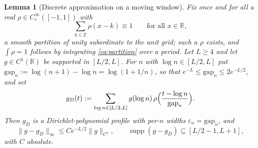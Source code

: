 \documentclass[11pt]{amsart}
\newtheorem{lemma}[theorem]{Lemma}
\theoremstyle{definition}
\theoremstyle{remark}
\newcommand{\R}{\mathbb R}
\newcommand{\Z}{\mathbb Z}
\newcommand{\supp}{\operatorname{supp}}
\begin{document}
\begin{lemma}[Discrete approximation on a moving window]
\label{lem:discreteapprox}
Fix once and for all a real $\rho\in C_c^\infty([-1,1])$ with
\begin{equation}\label{eq:partition}
  \sum_{k\in\Z}\rho(x-k)\equiv1\qquad\text{for all }x\in\R,
\end{equation}
a smooth partition of unity subordinate to the unit grid; such a $\rho$ exists,
and $\int\rho=1$ follows by integrating \eqref{eq:partition} over a period. Let
$L\ge4$ and let $g\in C^1(\R)$ be supported in $[L/2,L]$. For $n$ with
$\log n\in[L/2,L]$ put $\mathrm{gap}_n:=\log(n+1)-\log n=\log(1+1/n)$, so that
$e^{-L}\le\mathrm{gap}_n\le2e^{-L/2}$, and set
\begin{equation}\label{eq:gD}
  g_D(t):=\sum_{\log n\in[L/2,L]}g(\log n)\,
    \rho\Bigl(\frac{t-\log n}{\mathrm{gap}_n}\Bigr).
\end{equation}
Then $g_D$ is a Dirichlet-polynomial profile with per-$n$ widths
$\varepsilon_n=\mathrm{gap}_n$, and
\begin{equation}\label{eq:gDapprox}
  \|g-g_D\|_\infty\le Ce^{-L/2}\|g\|_{C^1},\qquad
  \supp(g-g_D)\subseteq[L/2-1,L+1],
\end{equation}
with $C$ absolute.
\end{lemma}
\end{document}
